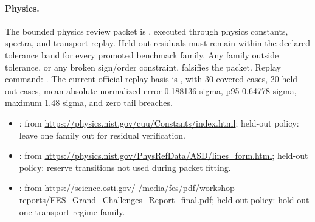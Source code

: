 \paragraph{Physics.}
The bounded physics review packet is
, executed through
physics constants, spectra, and transport replay. Held-out
residuals must remain within the declared tolerance band for every promoted
benchmark family. Any family outside tolerance, or any broken sign/order
constraint, falsifies the packet. Replay command:
.
The current official replay basis is ,
with 30 covered cases, 20 held-out cases, mean absolute normalized error
0.188136 sigma, p95 0.64778 sigma, maximum 1.48 sigma, and zero tail breaches.
\begin{itemize}[leftmargin=1.5em,nosep]
\item {}:  from \url{https://physics.nist.gov/cuu/Constants/index.html}; held-out policy: leave one family out for residual verification.
\item {}:  from \url{https://physics.nist.gov/PhysRefData/ASD/lines_form.html}; held-out policy: reserve transitions not used during packet fitting.
\item {}:  from \url{https://science.osti.gov/-/media/fes/pdf/workshop-reports/FES_Grand_Challenges_Report_final.pdf}; held-out policy: hold out one transport-regime family.
\end{itemize}

